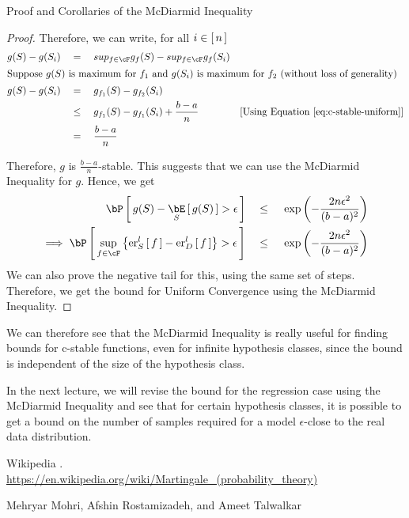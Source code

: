 \documentclass{article}
\begin{document}
\begin{ssection}{Proof and Corollaries of the McDiarmid Inequality}
\begin{proof}
			Therefore, we can write, for all $i \in \left[\,{n}\,\right]$
			\begin{align*}
				g(S) - g(S_i) & \eq	sup_{f \in \cF} g_f(S) - sup_{f \in \cF} g_f(S_i)                                             \\
				\intertext{Suppose $g(S)$ is maximum for $f_1$ and $g(S_i)$ is maximum for $f_2$ (without loss of generality)}
				g(S) - g(S_i) & \eq	g_{f_1}(S) - g_{f_2}(S_i)                                                                     \\
				              & \qle	g_{f_1}(S) - g_{f_1}(S_i) + \frac{b - a}{n} \mcmnt{Using Equation \ref{eq:c-stable-uniform}} \\
				              & \eq	\frac{b - a}{n}                                                                               
			\end{align*}
			
			Therefore, $g$ is $\frac{b-a}{n}$-stable. This suggests that we can use the McDiarmid Inequality for $g$. Hence, we get
			\begin{align*}
				\prob{g(S) - \E[S]{g(S)} > \epsilon}                                            & \qle	\texp{- \frac{2 n \epsilon^2}{(b - a)^2}} \\
				\implies \prob{\sup_{f \in \cF} \set{\err[_S^l]{f} - \err[_D^l]{f}} > \epsilon} & \qle	\texp{- \frac{2 n \epsilon^2}{(b - a)^2}} 
			\end{align*}
			We can also prove the negative tail for this, using the same set of steps. Therefore, we get the bound for Uniform Convergence using the McDiarmid Inequality.
		\end{proof}
		
		We can therefore see that the McDiarmid Inequality is really useful for finding bounds for c-stable functions, even for infinite hypothesis classes, since the bound is independent of the size of the hypothesis class.
		
		In the next lecture, we will revise the bound for the regression case using the McDiarmid Inequality and see that for certain hypothesis classes, it is possible to get a bound on the number of samples required for a model $\epsilon$-close to the real data distribution.
		
		\end{ssection}
		
		\begin{thebibliography}{10}
			
			Wikipedia
			. \\
			\href{https://en.wikipedia.org/wiki/Martingale_(probability_theory)}{\url{https://en.wikipedia.org/wiki/Martingale_(probability_theory)}}
			
			Mehryar Mohri, Afshin Rostamizadeh, and Ameet Talwalkar
			
		\end{thebibliography}
		
\end{document}
